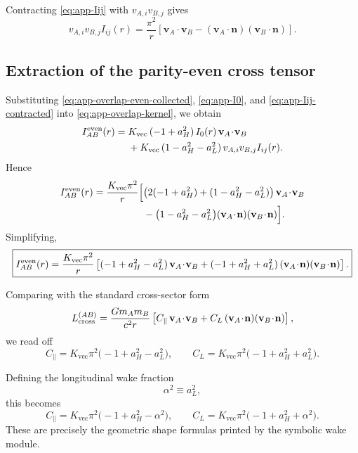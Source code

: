 \documentclass[11pt]{article}
\newcommand{\vct}{\mathbf v}
\newcommand{\nvec}{\mathbf n}
\newcommand{\Kvec}{K_{\mathrm{vec}}}
\newcommand{\alphaSq}{\alpha^2}
\newcommand{\Cpara}{C_{\parallel}}
\newcommand{\CLong}{C_{L}}
\begin{document}
Contracting \eqref{eq:app-Iij} with \(v_{A,i}v_{B,j}\) gives
\begin{equation}
v_{A,i}v_{B,j}I_{ij}(r)
=
\frac{\pi^2}{r}
\left[
\vct_A\!\cdot\!\vct_B
-
(\vct_A\!\cdot\!\nvec)(\vct_B\!\cdot\!\nvec)
\right].
\label{eq:app-Iij-contracted}
\end{equation}

\subsection{Extraction of the parity-even cross tensor}
\label{app:wake-extraction}

Substituting \eqref{eq:app-overlap-even-collected},
\eqref{eq:app-I0}, and \eqref{eq:app-Iij-contracted} into
\eqref{eq:app-overlap-kernel}, we obtain
\begin{align}
I_{AB}^{\rm even}(r)
={}&
\Kvec\,(-1+a_H^2)\,I_0(r)\,\vct_A\!\cdot\!\vct_B
\nonumber\\
&
+\Kvec\,(1-a_H^2-a_L^2)\,
v_{A,i}v_{B,j}I_{ij}(r).
\label{eq:app-IAB-even-step}
\end{align}
Hence
\begin{align}
I_{AB}^{\rm even}(r)
=
\frac{\Kvec\pi^2}{r}
\Big[
&\bigl(2(-1+a_H^2)+(1-a_H^2-a_L^2)\bigr)\,\vct_A\!\cdot\!\vct_B
\nonumber\\
&
-\bigl(1-a_H^2-a_L^2\bigr)
(\vct_A\!\cdot\!\nvec)(\vct_B\!\cdot\!\nvec)
\Big].
\label{eq:app-IAB-even-expanded}
\end{align}
Simplifying,
\begin{equation}
\boxed{
I_{AB}^{\rm even}(r)
=
\frac{\Kvec\pi^2}{r}
\left[
(-1+a_H^2-a_L^2)\,\vct_A\!\cdot\!\vct_B
+
(-1+a_H^2+a_L^2)\,
(\vct_A\!\cdot\!\nvec)(\vct_B\!\cdot\!\nvec)
\right].
}
\label{eq:app-IAB-even-final}
\end{equation}

Comparing with the standard cross-sector form
\begin{equation}
L_{\rm cross}^{(AB)}
=
\frac{Gm_A m_B}{c^2 r}
\left[
\Cpara\,\vct_A\!\cdot\!\vct_B
+
\CLong\,(\vct_A\!\cdot\!\nvec)(\vct_B\!\cdot\!\nvec)
\right],
\label{eq:app-cross-standard}
\end{equation}
we read off
\begin{equation}
\boxed{
\Cpara
=
\Kvec\pi^2\bigl(-1+a_H^2-a_L^2\bigr),
\qquad
\CLong
=
\Kvec\pi^2\bigl(-1+a_H^2+a_L^2\bigr).
}
\label{eq:app-Cpara-CLong}
\end{equation}

Defining the longitudinal wake fraction
\begin{equation}
\alphaSq \equiv a_L^2,
\label{eq:app-alphaSq-def}
\end{equation}
this becomes
\begin{equation}
\Cpara
=
\Kvec\pi^2\bigl(-1+a_H^2-\alphaSq\bigr),
\qquad
\CLong
=
\Kvec\pi^2\bigl(-1+a_H^2+\alphaSq\bigr).
\label{eq:app-Cpara-CLong-alpha}
\end{equation}
These are precisely the geometric shape formulas printed by the symbolic wake module.
\end{document}
